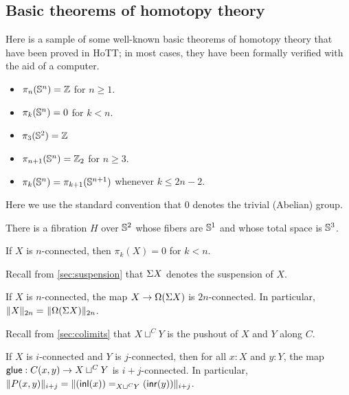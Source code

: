 \subsection{Basic theorems of homotopy theory}

Here is a sample of some well-known basic theorems of homotopy theory that have been proved in
HoTT; in most
cases, they have been formally verified with the aid of a computer.

\begin{thm}\label{homotopy-groups-of-spheres}
\mbox{}
\begin{itemize}
\item $\pi_n(\Sn ^n) = \Z$ for $n \ge 1$.
\item $\pi_k(\Sn ^n) = 0$ for $k < n$.  
\item $\pi_3(\Sn ^2) = \Z$
\item $\pi_{n+1}(\Sn ^n) = \Z_2$ for $n \ge 3$.    
\item $\pi_k(\Sn ^n) = \pi_{k+1}(\Sn ^{n+1})$ whenever $k \le 2n - 2$.  
\end{itemize}
\end{thm}

Here we use the standard convention that $0$ denotes the trivial (Abelian) group.

\begin{thm}\label{hopf-fibration}
There is a fibration $H$ over $\Sn ^2$ whose fibers are $\Sn ^1$ and
whose total space is $\Sn ^3$.  
\end{thm}

\begin{thm}\label{low-homotopy-of-connected-types}
  If $X$ is $n$-connected, then $\pi_k(X) = 0$ for $k < n$.
\end{thm}

Recall from \autoref{sec:suspension} that $\susp X$ denotes the suspension of $X$.

\begin{thm}\label{Freudenthal}
  If $X$ is $n$-connected, the map $X \rightarrow \Omega(\susp X)$ is $2n$-connected.
  In particular, $\id{\trunc{2n}{X}}{\trunc{2n}{\Omega(\susp X)}}$.
\end{thm}

Recall from \autoref{sec:colimits} that $X \sqcup^C Y$ is the pushout of $X$ and $Y$ along $C$.

\begin{thm}\label{Blakers-Massey}
  If $X$ is $i$-connected and $Y$ is
  $j$-connected, then for all $x:X$ and $y:Y$, the map $\glue : C(x,y)
  \rightarrow X \sqcup^C Y$ is $i+j$-connected.  In
  particular, $\trunc {i+j} {P(x,y)} = \trunc {i+j} {\id [X \sqcup^C Y]
    {(\inl(x))} {(\inr(y))}}$.
\end{thm}

